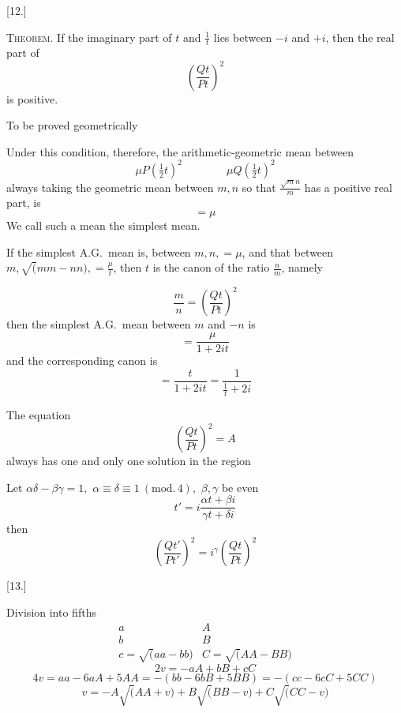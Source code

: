 \begingroup
\renewcommand{\arraystretch}{1.45}

\par\medskip{}\centerline{[12.]}\nobreak\smallskip
\textsc{Theorem.} If the imaginary part of \(t\) and \(\frac1t\) lies between \(-i\) and
\(+i\), then the real part of
\[
\left(\frac{Qt}{Pt}\right)^2
\]
is positive.

\noindent\begin{minipage}{.45\linewidth}
To be proved geometrically
\end{minipage}\hfill
\resizebox{.47\linewidth}{!}{}


Under this condition, therefore, the arithmetic-geometric mean between
\[
\mu P(\tfrac12t)^2\qquad\qquad\mu Q(\tfrac12t)^2
\]
always taking the geometric mean between \(m,n\) so that
\(\frac{\surd mn}{m}\) has a positive real part, is
\[
=\mu
\]
We call such a mean the simplest mean.


If the simplest A.G.\ mean is, between \(m,n,=\mu\), and that between
\(m,\surd(mm-nn),=\frac\mu t\), then \(t\) is the canon of the ratio
\(\frac nm\), namely

\[
\frac mn=\left(\frac{Qt}{Pt}\right)^2
\]
then the simplest A.G.\ mean between \(m\) and \(-n\) is
\[
=\frac\mu{1+2it}
\]
and the corresponding canon is
\[
=\frac t{1+2it}=\frac1{\frac1t+2i}
\]


The equation
\[
\left(\frac{Qt}{Pt}\right)^2=A
\]
always has one and only one solution in the region
\begin{center}
\resizebox{.48\linewidth}{!}{}
\end{center}


Let \(\alpha\delta-\beta\gamma=1,\)
\(\alpha\equiv\delta\equiv1\ (\mathrm{mod.}\,4),\)
\(\beta,\gamma\) be even
\[
t'=i\frac{\alpha t+\beta i}{\gamma t+\delta i}
\]
then
\[
\left(\frac{Qt'}{Pt'}\right)^2=i^\gamma\left(\frac{Qt}{Pt}\right)^2
\]


\par\medskip{}\centerline{[13.]}\nobreak\smallskip
Division into fifths
\[
\begin{array}{ll}
a&A\\[8pt]
b&B\\[8pt]
c=\surd(aa-bb)&C=\surd(AA-BB)
\end{array}
\]
\[
2v=-aA+bB+cC
\]
\[
4v=aa-6aA+5AA=-(bb-6bB+5BB)=-(cc-6cC+5CC)
\]
\[
v=-A\surd(AA+v)+B\surd(BB-v)+C\surd(CC-v)
\]


